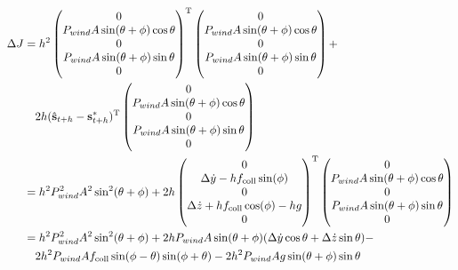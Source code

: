 \begin{equation}
\begin{aligned}
\Delta J &= h^{2}\begin{pmatrix} 0 \\ P_{wind} A \sin(\theta + \phi) \cos \theta \\ 0 \\ P_{wind} A \sin(\theta + \phi) \sin \theta \\ 0
\end{pmatrix}^{\mathrm{T}}\begin{pmatrix} 0 \\ P_{wind} A \sin(\theta + \phi) \cos \theta \\ 0 \\ P_{wind} A \sin(\theta + \phi) \sin \theta \\ 0
\end{pmatrix} + \\
& \quad 2h(\hat{\mathbf{s}}_{t+h} - \mathbf{s}^{*}_{t+h})^{\mathrm{T}}\begin{pmatrix} 0 \\ P_{wind} A \sin(\theta + \phi) \cos \theta \\ 0 \\ P_{wind} A \sin(\theta + \phi) \sin \theta \\ 0
\end{pmatrix} \\
&= h^{2}P_{wind}^{2}A^{2}\sin^{2}(\theta + \phi) + 2h \begin{pmatrix} 0 \\ \Delta \dot{y} - hf_{\mathrm{coll}} \sin(\phi) \\ 0 \\ \Delta \dot{z} + hf_{\mathrm{coll}} \cos(\phi) - hg \\ 0 \end{pmatrix}^{\mathrm{T}}  \begin{pmatrix} 0 \\ P_{wind} A \sin(\theta + \phi) \cos \theta \\ 0 \\ P_{wind} A \sin(\theta + \phi) \sin \theta \\ 0 \end{pmatrix} \\
&= h^{2}P_{wind}^{2}A^{2}\sin^{2}(\theta + \phi) + 2hP_{wind}A \sin(\theta + \phi)(\Delta \dot{y} \cos\theta + \Delta \dot{z} \sin\theta) - \\ 
& \quad 2h^{2}P_{wind}Af_{\mathrm{coll}}\sin(\phi - \theta)\sin(\phi + \theta) - 2h^{2}P_{wind}Ag \sin(\theta + \phi) \sin\theta 
\end{aligned}
\label{derivationQuad}
\end{equation}

